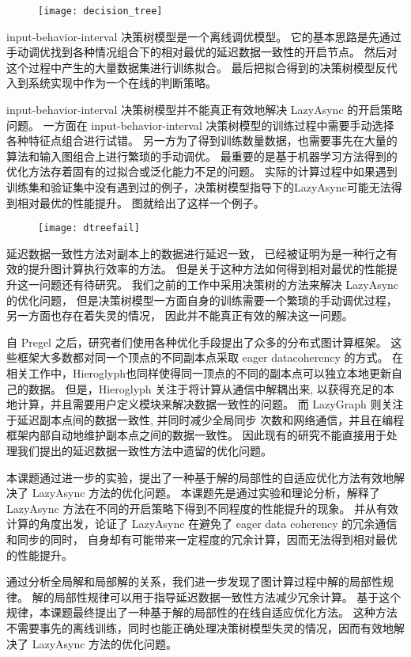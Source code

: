 \begin{figure}[!htbp]
\centering
\texttt{[image: decision\_tree]}
\label{fig:dtree}
\end{figure}


input-behavior-interval 决策树模型是一个离线调优模型。
它的基本思路是先通过手动调优找到各种情况组合下的相对最优的延迟数据一致性的开启节点。
然后对这个过程中产生的大量数据集进行训练拟合。
最后把拟合得到的决策树模型反代入到系统实现中作为一个在线的判断策略。


input-behavior-interval 决策树模型并不能真正有效地解决 LazyAsync 的开启策略问题。
一方面在 input-behavior-interval 决策树模型的训练过程中需要手动选择各种特征点组合进行试错。
另一方为了得到训练数量数据，也需要事先在大量的算法和输入图组合上进行繁琐的手动调优。
最重要的是基于机器学习方法得到的优化方法存着固有的过拟合或泛化能力不足的问题。
实际的计算过程中如果遇到训练集和验证集中没有遇到过的例子，决策树模型指导下的LazyAsync可能无法得到相对最优的性能提升。
图\label{fig:dtfail}就给出了这样一个例子。

\begin{figure}[!htbp]
\centering
\texttt{[image: dtreefail]}
\label{fig:dtfail}
\end{figure}

延迟数据一致性方法对副本上的数据进行延迟一致，
已经被证明为是一种行之有效的提升图计算执行效率的方法。
但是关于这种方法如何得到相对最优的性能提升这一问题还有待研究。
我们之前的工作中采用决策树的方法来解决 LazyAsync 的优化问题，
但是决策树模型一方面自身的训练需要一个繁琐的手动调优过程，另一方面也存在着失灵的情况，
因此并不能真正有效的解决这一问题。


自 Pregel 之后，研究者们使用各种优化手段提出了众多的分布式图计算框架。
这些框架大多数都对同一个顶点的不同副本点采取 eager datacoherency 的方式。
在相关工作中，Hieroglyph\cite{ju2017hieroglyph}也同样使得同一顶点的不同的副本点可以独立本地更新自己的数据。
但是，Hieroglyph 关注于将计算从通信中解耦出来, 以获得充足的本地计算，并且需要用户定义模块来解决数据一致性的问题。
而 LazyGraph 则关注于延迟副本点间的数据一致性, 并同时减少全局同步 次数和网络通信，并且在编程框架内部自动地维护副本点之间的数据一致性。 
因此现有的研究不能直接用于处理我们提出的延迟数据一致性方法中遗留的优化问题。


本课题通过进一步的实验，提出了一种基于解的局部性的自适应优化方法有效地解决了 LazyAsync 方法的优化问题。
本课题先是通过实验和理论分析，解释了LazyAsync 方法在不同的开启策略下得到不同程度的性能提升的现象。
并从有效计算的角度出发，论证了 LazyAsync 在避免了 eager data coherency 的冗余通信和同步的同时，
自身却有可能带来一定程度的冗余计算，因而无法得到相对最优的性能提升。

通过分析全局解和局部解的关系，我们进一步发现了图计算过程中解的局部性规律。
解的局部性规律可以用于指导延迟数据一致性方法减少冗余计算。
基于这个规律，本课题最终提出了一种基于解的局部性的在线自适应优化方法。
这种方法不需要事先的离线训练，同时也能正确处理决策树模型失灵的情况，因而有效地解决了
LazyAsync 方法的优化问题。
